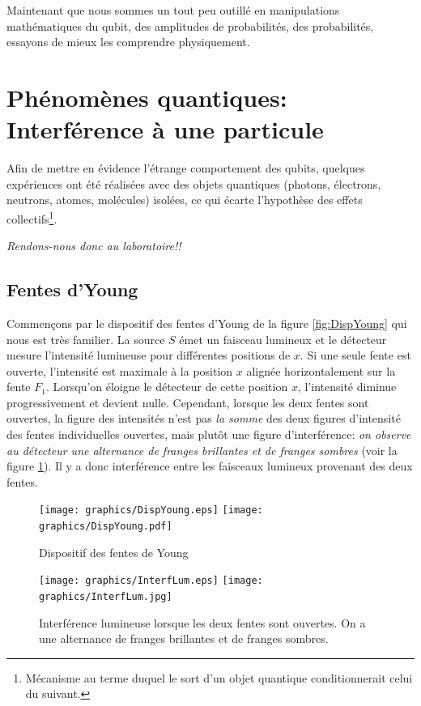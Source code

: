 Maintenant que nous sommes un tout peu outillé en manipulations
mathématiques du qubit, des amplitudes de probabilités, des
probabilités, essayons de mieux les comprendre physiquement.

\section{Phénomènes quantiques: Interférence à une particule}

\label{sec:Inter1Part}

Afin de mettre en évidence l'étrange comportement des qubits, quelques
expériences ont été réalisées avec des objets quantiques (photons, électrons,
neutrons, atomes, molécules) isolées, ce qui écarte l'hypothèse des effets
collectifs\footnote{Mécanisme au terme duquel le sort d'un objet quantique
conditionnerait celui du suivant.}.
\bigskip

\emph{Rendons-nous donc au laboratoire!!}

\subsection{Fentes d'Young}

Commençons par le dispositif des fentes d'Young de la figure \ref{fig:DispYoung}
qui nous est très familier. La source $S$ émet un faisceau lumineux et le
détecteur mesure l'intensité lumineuse pour différentes positions de $x$. Si une
seule fente est ouverte, l'intensité est maximale à la position $x$ alignée
horizontalement sur la fente $F_1$. Lorsqu'on éloigne le détecteur de cette
position $x$, l'intensité diminue progressivement et devient nulle. Cependant,
lorsque les deux fentes sont ouvertes, la figure des intensités n'est pas
\textit{la somme} des deux figures d'intensité des fentes individuelles
ouvertes, mais plutôt une figure d'interférence: \textit{on observe au détecteur
une alternance de franges brillantes et de franges sombres} (voir la figure
\ref{fig:InterfLum}). Il y a donc interférence entre les faisceaux lumineux
provenant des deux fentes.

\begin{figure}[tbhp]
\begin{minipage}[c]{.48\linewidth}
\centering
\ifcase\msipdfoutput
	\texttt{[image: graphics/DispYoung.eps]}%
\else
	\texttt{[image: graphics/DispYoung.pdf]}%
\fi
\caption{Dispositif des fentes de Young}
\label{fig:DispYoung}%
\end{minipage} \hfill\begin{minipage}[c]{.48\linewidth}
\centering
\ifcase\msipdfoutput
	\texttt{[image: graphics/InterfLum.eps]}%
\else
	\texttt{[image: graphics/InterfLum.jpg]}%
\fi
\caption{Interférence lumineuse lorsque les deux fentes sont ouvertes. On a
une alternance de franges brillantes et de franges sombres.}%
\label{fig:InterfLum}%
\end{minipage}
\end{figure}

